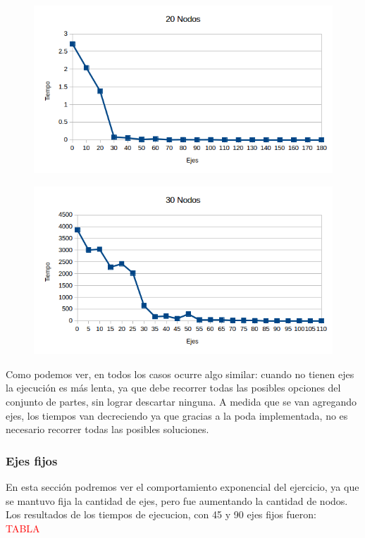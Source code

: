   \begin{figure}[h!]
   \begin{center}
 	\includegraphics[scale=0.7]{imagenes/exacto/20Nodos.png}
   \end{center}
 \end{figure}
   \begin{figure}[h!]
   \begin{center}
 	\includegraphics[scale=0.7]{imagenes/exacto/30Nodos.png}
   \end{center}
 \end{figure}
 
Como podemos ver, en todos los casos ocurre algo similar: cuando no tienen ejes la ejecuci\'on es m\'as lenta, ya que debe recorrer todas las posibles opciones del conjunto de partes, sin lograr descartar ninguna.
A medida que se van agregando ejes, los tiempos van decreciendo ya que gracias a la poda implementada, no es necesario recorrer todas las posibles soluciones.\\

\subsubsection{Ejes fijos}
En esta secci\'on podremos ver el comportamiento exponencial del ejercicio, ya que se mantuvo fija la cantidad de ejes, pero fue aumentando la cantidad de nodos.
Los resultados de los tiempos de ejecucion, con 45 y 90 ejes fijos fueron:\\
\textcolor{red}{TABLA}


